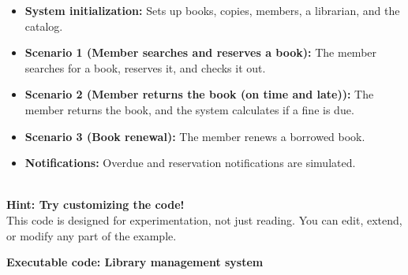 \begin{itemize}
\item
\protect{}\label{7EFXP5upV1bUsIv9mBy_E}
\textbf{System initialization:} Sets up books, copies, members, a librarian, and the catalog.
\item
\protect{}\label{lapO-FuT5TaGSEZ3qxHHU}
\textbf{Scenario 1 (Member searches and reserves a book):} The member searches for a book, reserves it, and checks it out.
\item
\protect{}\label{Jinz3BEdi5-y5pU3ZsrwM}
\textbf{Scenario 2 (Member returns the book (on time and late)):} The member returns the book, and the system calculates if a fine is due.
\item
\protect{}\label{LoLbHdGec5VHdwjFqzwIU}
\textbf{Scenario 3 (Book renewal):} The member renews a borrowed book.
\item
\protect{}\label{sy_-cBalcSVj99HSEXFEo}
\textbf{Notifications:} Overdue and reservation notifications are simulated.
\end{itemize}
\\
\textbf{Hint: Try customizing the code!}
\\
This code is designed for experimentation, not just reading. You can edit, extend, or modify any part of the example.

\textbf{Executable code: Library management system}

